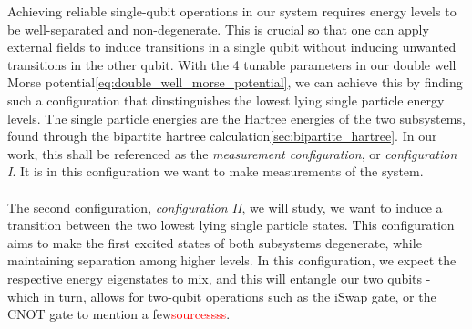 \documentclass{subfiles}
\begin{document}
Achieving reliable single-qubit operations in our system requires energy levels to be well-separated and non-degenerate. This is crucial so that one can apply external fields to induce transitions in a single qubit without inducing unwanted transitions in the other qubit. With the 4 tunable parameters in our double well Morse potential\ref{eq:double_well_morse_potential}, we can achieve this by finding such a configuration that dinstinguishes the lowest lying single particle energy levels. The single particle energies are the Hartree energies of the two subsystems, found through the bipartite hartree calculation\ref{sec:bipartite_hartree}. In our work, this shall be referenced as the \emph{measurement configuration}, or \emph{configuration I}. It is in this configuration we want to make measurements of the system. 
\\ \\
The second configuration, \emph{configuration II}, we will study, we want to induce a transition between the two lowest lying single particle states. This configuration aims to make the first excited states of both subsystems degenerate, while maintaining separation among higher levels. In this configuration, we expect the respective energy eigenstates to mix, and this will entangle our two qubits - which in turn, allows for two-qubit operations such as the iSwap gate, or the CNOT gate to mention a few\textcolor{red}{sourcessss}.
\end{document}
